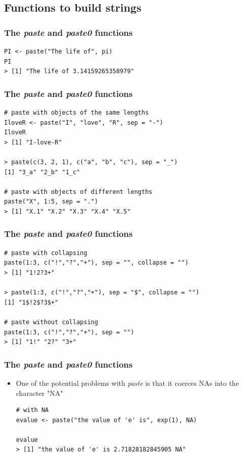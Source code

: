 \documentclass[xcolor=dvipsnames, xcolor=table]{beamer} %
\theoremstyle{mystyle}
\begin{document}
\subsection{Functions to build strings}

\begin{frame}[fragile]
\frametitle{The \textit{paste} and \textit{paste0} functions}

\begin{verbatim}
PI <- paste("The life of", pi)
PI
> [1] "The life of 3.14159265358979"
\end{verbatim}

\end{frame}

\begin{frame}[fragile]
\frametitle{The \textit{paste} and \textit{paste0} functions}

\begin{verbatim}
# paste with objects of the same lengths
IloveR <- paste("I", "love", "R", sep = "-")
IloveR
> [1] "I-love-R"

> paste(c(3, 2, 1), c("a", "b", "c"), sep = "_")
[1] "3_a" "2_b" "1_c"

# paste with objects of different lengths
paste("X", 1:5, sep = ".")
> [1] "X.1" "X.2" "X.3" "X.4" "X.5"
\end{verbatim}

\end{frame}

\begin{frame}[fragile]
\frametitle{The \textit{paste} and \textit{paste0} functions}

\begin{verbatim}
# paste with collapsing
paste(1:3, c("!","?","+"), sep = "", collapse = "")
> [1] "1!2?3+"

> paste(1:3, c("!","?","+"), sep = "$", collapse = "")
[1] "1$!2$?3$+"

# paste without collapsing
paste(1:3, c("!","?","+"), sep = "")
> [1] "1!" "2?" "3+"

\end{verbatim}

\end{frame}


\begin{frame}[fragile]
\frametitle{The \textit{paste} and \textit{paste0} functions}

\begin{itemize}
\item One of the potential problems with \textit{paste} is that it coerces NAs into the character "NA"

\begin{verbatim}
# with NA
evalue <- paste("the value of 'e' is", exp(1), NA)

evalue
> [1] "the value of 'e' is 2.71828182845905 NA"
\end{verbatim}
\end{itemize}

\end{frame}
\end{document}
